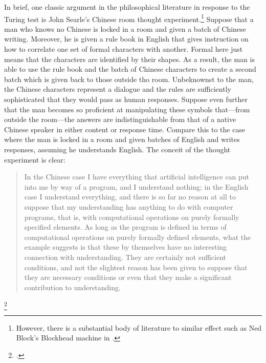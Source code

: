 \documentclass[letterpaper,notitlepage,12pt]{article}
\begin{document}
In brief, one classic argument in the philosophical literature in response to
the Turing test is John Searle's Chinese room thought
experiment.\footnote{However, there is a substantial body of literature to
  similar effect such as Ned Block's Blockhead machine in
.}
Suppose that a man who knows no Chinese is locked in a room and given a batch of
Chinese writing.
Moreover, he is given a rule book in English that gives instruction on how to
correlate one set of formal characters with another.
Formal here just means that the characters are identified by their shapes.
As a result, the man is able to use the rule book and the batch of Chinese
characters to create a second batch which is given back to those outside tho
room. Unbeknownst to the man, the Chinese characters represent a dialogue and
the rules are sufficiently sophisticated that they would pass as human
responses.
Suppose even further that the man becomes so proficient at manipulating these
symbols that---from outside the room---the answers are indistinguishable from
that of a native Chinese speaker in either content or response time.
Compare this to the case where the man is locked in a room and given batches of
English and writes responses, assuming he understands English.
The conceit of the thought experiment is clear: \blockquote{In the Chinese case
  I have everything that
artificial intelligence can put into me by way of a program,
and I understand nothing; in the English case I understand
everything, and there is so far no reason at all to suppose that
my understanding has anything to do with computer
programs, that is, with computational operations on purely
formally specified elements. As long as the program is
defined in terms of computational operations on purely
formally defined elements, what the example suggests is that
these by themselves have no interesting connection with
understanding. They are certainly not sufficient conditions,
and not the slightest reason has been given to suppose that
they are necessary conditions or even that they make a
significant contribution to understanding.}\footcite[p. 418]{searle_minds_1980}
\end{document}
